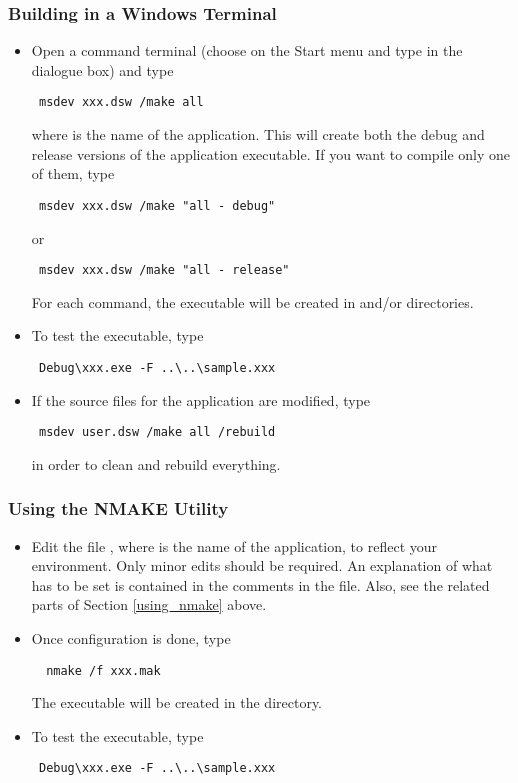 \subsubsection{Building in a Windows Terminal}
\begin{itemize}
\item Open a command terminal (choose  on the Start menu and type
 in the dialogue box) and type
{\color{Brown}
\begin{verbatim}
 msdev xxx.dsw /make all
\end{verbatim}
} where  is the name of the application. This will create both the
debug and release versions of the application executable. If you want to
compile only one of them, type 
{\color{Brown}
\begin{verbatim}
 msdev xxx.dsw /make "all - debug"
\end{verbatim}
}
or 
{\color{Brown}
\begin{verbatim}
 msdev xxx.dsw /make "all - release"
\end{verbatim}
}
For each command, the executable  will be created in 
 and/or 
directories. 

\item To test the executable, type 
{\color{Brown}
\begin{verbatim}
 Debug\xxx.exe -F ..\..\sample.xxx
\end{verbatim}
}
\item If the source files for the application are modified, type 
{\color{Brown}
\begin{verbatim}
 msdev user.dsw /make all /rebuild
\end{verbatim}
}
in order to clean and rebuild everything.
\end{itemize} 

\subsubsection{Using the NMAKE Utility}

\begin{itemize}
\item 
Edit the file , where  is the name of the application,
to reflect your environment. Only minor edits should be required. An
explanation of what has to be set is contained in the comments in the
 file. Also, see the related parts of Section \ref{using_nmake}
above.

\item Once configuration is done, type 
{\color{Brown}
\begin{verbatim}
  nmake /f xxx.mak
\end{verbatim}
}
The executable  will be created in the  directory.
\item To test the executable, type 
{\color{Brown}
\begin{verbatim}
 Debug\xxx.exe -F ..\..\sample.xxx
\end{verbatim}
}
\end{itemize}

